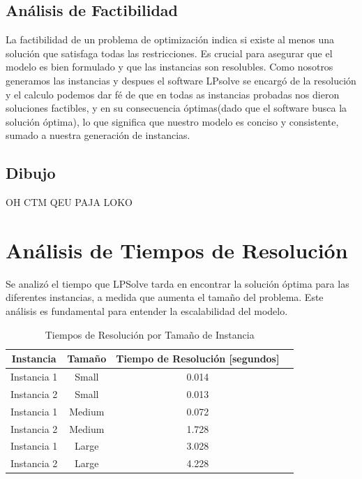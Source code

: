 \documentclass[12pt]{article}
\begin{document}
\subsection{Análisis de Factibilidad}
La factibilidad de un problema de optimización indica si existe al menos una solución que satisfaga todas las restricciones. Es crucial para asegurar que el modelo es bien formulado y que las instancias son resolubles. Como nosotros generamos las instancias y despues el software LPsolve se encargó de la resolución y el calculo podemos dar fé de que en todas as instancias probadas nos dieron soluciones factibles, y en su consecuencia óptimas(dado que el software busca la solución óptima), lo que significa que nuestro modelo es conciso y consistente, sumado a nuestra generación de instancias.
\subsection{Dibujo}
OH CTM QEU PAJA LOKO

\section{Análisis de Tiempos de Resolución}
Se analizó el tiempo que LPSolve tarda en encontrar la solución óptima para las diferentes instancias, a medida que aumenta el tamaño del problema. Este análisis es fundamental para entender la escalabilidad del modelo.

\begin{table}[H]
    \centering
    \caption{Tiempos de Resolución por Tamaño de Instancia}
    \label{tab:Tiempos_resolucion}
    \begin{tabular}{|c|c|c|c|}
        \hline
        \textbf{Instancia} & \textbf{Tamaño} & \textbf{Tiempo de Resolución [segundos]} \\
        \hline
        Instancia 1 & Small & 0.014 \\
        Instancia 2 & Small & 0.013 \\
        \hline
        Instancia 1 & Medium & 0.072 \\
        Instancia 2 & Medium & 1.728 \\
        \hline
        Instancia 1 & Large & 3.028 \\
        Instancia 2 & Large & 4.228 \\
        \hline
    \end{tabular}
\end{table}
\end{document}
